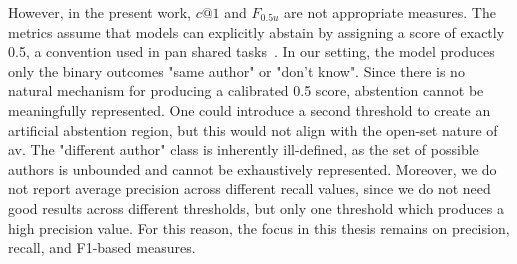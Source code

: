 However, in the present work, $c@1$ and $F_{0.5u}$ are not appropriate measures. 
The metrics assume that models can explicitly abstain by assigning a score of exactly 0.5, a convention used in \ac{pan} shared tasks~\citep{tyo_state_2022,bevendorff_overview_2024,kocher_unine_2015}. 
In our setting, the model produces only the binary outcomes "same author" or "don't know". 
Since there is no natural mechanism for producing a calibrated 0.5 score, abstention cannot be meaningfully represented. 
One could introduce a second threshold to create an artificial abstention region, but this would not align with the open-set nature of \ac{av}. 
The "different author" class is inherently ill-defined, as the set of possible authors is unbounded and cannot be exhaustively represented. 
Moreover, we do not report average precision across different recall values, since we do not need good results across different thresholds, but only one threshold which produces a high precision value.
For this reason, the focus in this thesis remains on precision, recall, and F1-based measures. 








